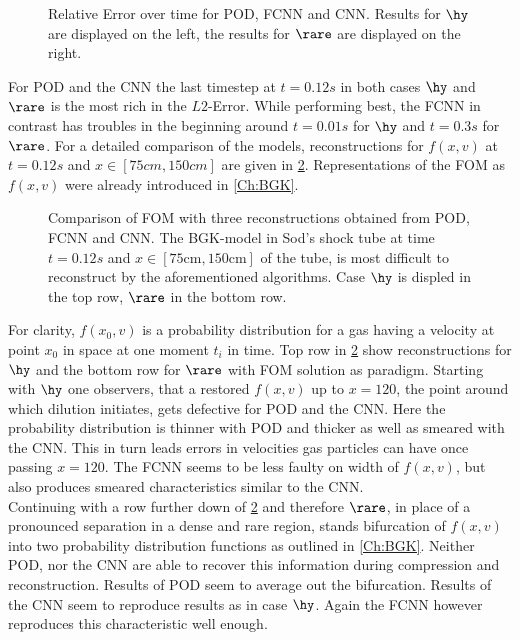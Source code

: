 \begin{figure}[htpb!]
	
	\caption{Relative Error over time for POD, FCNN and CNN. Results for $\hy$ are displayed on the left, the results for $\rare$ are displayed on the right.}
	\label{Fig:ErrTime}
\end{figure}
For POD and the CNN the last timestep at $t=0.12s$ in both cases $\hy$ and $\rare$ is the most rich in the $L2$-Error. While performing best, the FCNN in contrast has troubles in the beginning around $t=0.01s$ for $\hy$  and $t=0.3s$ for $\rare$. For a detailed comparison of the models, reconstructions for $f(x,v)$ at $t=0.12s$ and $x \in [75cm,150cm]$ are given in \cref{Fig:ErrWorst}. Representations of the FOM as $f(x,v)$ were already introduced in \cref{Ch:BGK}.
\begin{figure}[hpb!]
	
	\caption{Comparison of FOM with three reconstructions obtained from POD, FCNN and CNN. The BGK-model in Sod's shock tube at time \(t=0.12s\) and \(x\in [75\textrm{cm}, 150\textrm{cm}]\) of the tube, is most difficult to reconstruct by the aforementioned algorithms. Case $\hy$ is displed in the top row, $\rare$ in the bottom row. }
	\label{Fig:ErrWorst}
\end{figure}
For clarity, $f(x_0,v)$ is a probability distribution for a gas having a velocity at point $x_0$ in space at one moment $t_i$ in time. Top row in \cref{Fig:ErrWorst} show reconstructions for $\hy$ and the bottom row for $\rare$ with FOM solution as paradigm. Starting with \(\hy\) one observers, that a restored \(f(x,v)\) up to \(x=120\), the point around which dilution initiates, gets defective for POD and the CNN. Here the probability distribution is thinner with POD and thicker as well as smeared with the CNN. This in turn leads errors in velocities gas particles can have once passing \(x=120\). The FCNN seems to be less faulty on width of \(f(x,v)\), but also produces smeared characteristics similar to the CNN.\\
Continuing with a row further down of \cref{Fig:ErrWorst} and therefore \(\rare\), in place of a pronounced separation in a dense and rare region, stands bifurcation of \(f(x,v)\) into two probability distribution functions as outlined in \cref{Ch:BGK}. Neither POD, nor the CNN are able to recover this information during compression and reconstruction. Results of POD seem to average out the bifurcation. Results of the CNN seem to reproduce results as in case \(\hy\). Again the FCNN however reproduces this characteristic well enough.\\      
